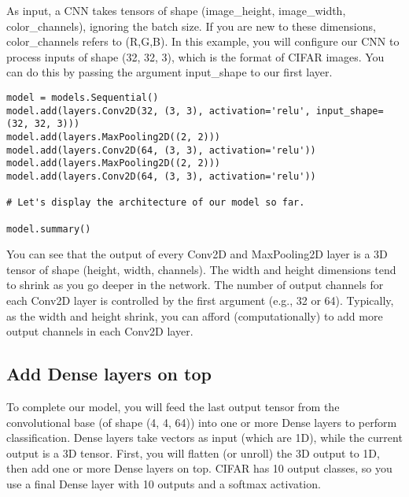 \documentclass[%
oneside,                 %
final,                   %
10pt]{article}
\begin{document}
As input, a CNN takes tensors of shape (image_height, image_width, color_channels), ignoring the batch size. If you are new to these dimensions, color_channels refers to (R,G,B). In this example, you will configure our CNN to process inputs of shape (32, 32, 3), which is the format of CIFAR images. You can do this by passing the argument input_shape to our first layer.












\begin{verbatim}
model = models.Sequential()
model.add(layers.Conv2D(32, (3, 3), activation='relu', input_shape=(32, 32, 3)))
model.add(layers.MaxPooling2D((2, 2)))
model.add(layers.Conv2D(64, (3, 3), activation='relu'))
model.add(layers.MaxPooling2D((2, 2)))
model.add(layers.Conv2D(64, (3, 3), activation='relu'))

# Let's display the architecture of our model so far.

model.summary()

\end{verbatim}


You can see that the output of every Conv2D and MaxPooling2D layer is a 3D tensor of shape (height, width, channels). The width and height dimensions tend to shrink as you go deeper in the network. The number of output channels for each Conv2D layer is controlled by the first argument (e.g., 32 or 64). Typically, as the width and height shrink, you can afford (computationally) to add more output channels in each Conv2D layer.

\subsection*{Add Dense layers on top}

To complete our model, you will feed the last output tensor from the
convolutional base (of shape (4, 4, 64)) into one or more Dense layers
to perform classification. Dense layers take vectors as input (which
are 1D), while the current output is a 3D tensor. First, you will
flatten (or unroll) the 3D output to 1D, then add one or more Dense
layers on top. CIFAR has 10 output classes, so you use a final Dense
layer with 10 outputs and a softmax activation.
\end{document}
